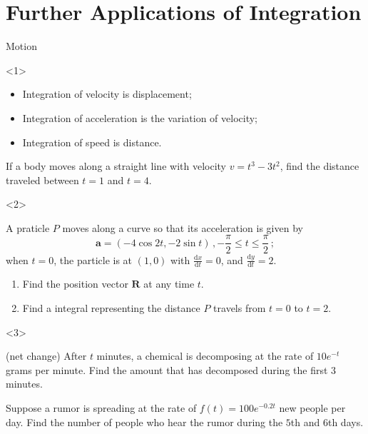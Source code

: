 \section[AppofInt2]{Further Applications of Integration}
\begin{frame}{Motion}

\begin{onlyenv}<1>

\begin{itemize}
\item Integration of velocity is displacement;
\item Integration of acceleration is the variation of velocity;
\item Integration of speed is distance.\end{itemize}
\begin{example}
If a body moves along a straight line with velocity $v=t^{3}-3t^{2}$,
find the distance traveled between $t=1$ and $t=4$.
\end{example}

\end{onlyenv}



\begin{onlyenv}<2>

\begin{example}
A praticle $P$ moves along a curve so that its acceleration is given
by
\[
\mathbf{a}=\left(-4\cos2t,-2\sin t\right)\,,-\frac{\pi}{2}\le t\le\frac{\pi}{2}\,;
\]
when $t=0$, the particle is at $\left(1,0\right)$ with $\frac{\mathrm{d}x}{\mathrm{d}t}=0$,
and $\frac{\mathrm{d}y}{\mathrm{d}t}=2$.
\begin{enumerate}
\item Find the position vector $\mathbf{R}$ at any time $t$.
\item Find a integral representing the distance $P$ travels from $t=0$
to $t=2$.
\end{enumerate}

\end{example}

\end{onlyenv}



\begin{onlyenv}<3>

\begin{example}
(net change) After $t$ minutes, a chemical is decomposing at the
rate of $10e^{-t}$ grams per minute. Find the amount that has decomposed
during the first $3$ minutes.
\end{example}



\begin{example}
Suppose a rumor is spreading at the rate of $f\left(t\right)=100e^{-0.2t}$
new people per day. Find the number of people who hear the rumor during
the $5$th and $6$th days.
\end{example}

\end{onlyenv}

\end{frame}



